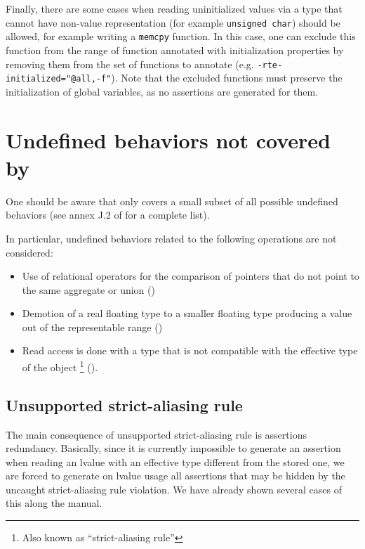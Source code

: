 Finally, there are some cases when reading uninitialized values via a type that
cannot have non-value representation (for example \lstinline{unsigned char}) should
be allowed, for example writing a \lstinline{memcpy} function. In this case, one
can exclude this function from the range of function annotated with
initialization properties by removing them from the set of functions to annotate
(e.g. \lstinline{-rte-initialized="@all,-f"}). Note that the excluded functions
must preserve the initialization of global variables, as no assertions are
generated for them.

\section{Undefined behaviors not covered by \rte{}}

One should be aware that \rte{} only covers a small subset of all possible
undefined behaviors (see annex J.2 of \cite{standardc23} for a complete list).

In particular, undefined behaviors related to the following operations are not
considered:

\begin{itemize}
\item Use of relational operators for the comparison of pointers that do not
  point to the same aggregate or union ()
\item Demotion of a real floating type to a smaller floating type
  producing a value out of the representable range ()
\item Read access is done with a type that is not compatible with the effective
  type of the object \footnote{Also known as ``strict-aliasing rule''}
  ().
\end{itemize}

\subsection{Unsupported strict-aliasing rule}
\label{subsec:strict-aliasing}

The main consequence of unsupported strict-aliasing rule is assertions
redundancy. Basically, since it is currently impossible to generate an assertion
when reading an lvalue with an effective type different from the stored one,
we are forced to generate on lvalue usage all assertions that may be hidden by
the uncaught strict-aliasing rule violation. We have already shown several cases
of this along the manual.

